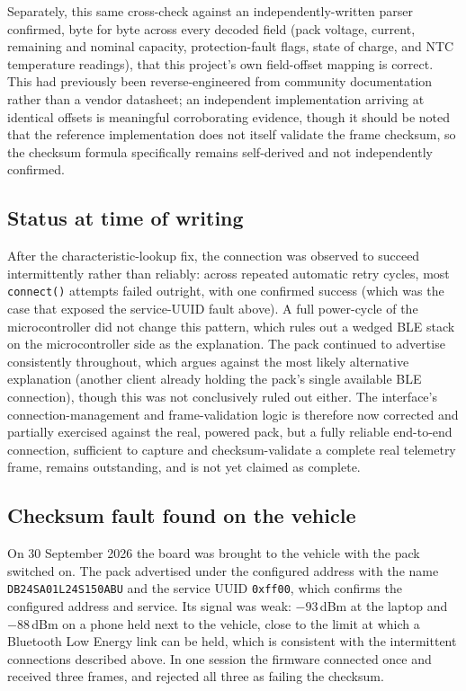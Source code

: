 Separately, this same cross-check against an independently-written parser confirmed, byte for byte across every decoded field (pack voltage, current, remaining and nominal capacity, protection-fault flags, state of charge, and NTC temperature readings), that this project's own field-offset mapping is correct. This had previously been reverse-engineered from community documentation rather than a vendor datasheet; an independent implementation arriving at identical offsets is meaningful corroborating evidence, though it should be noted that the reference implementation does not itself validate the frame checksum, so the checksum formula specifically remains self-derived and not independently confirmed.

\subsection{Status at time of writing}

After the characteristic-lookup fix, the connection was observed to succeed intermittently rather than reliably: across repeated automatic retry cycles, most \texttt{connect()} attempts failed outright, with one confirmed success (which was the case that exposed the service-UUID fault above). A full power-cycle of the microcontroller did not change this pattern, which rules out a wedged BLE stack on the microcontroller side as the explanation. The pack continued to advertise consistently throughout, which argues against the most likely alternative explanation (another client already holding the pack's single available BLE connection), though this was not conclusively ruled out either. The interface's connection-management and frame-validation logic is therefore now corrected and partially exercised against the real, powered pack, but a fully reliable end-to-end connection, sufficient to capture and checksum-validate a complete real telemetry frame, remains outstanding, and is not yet claimed as complete.

\subsection{Checksum fault found on the vehicle}

On 30 September 2026 the board was brought to the vehicle with the pack switched on. The pack advertised under the configured address with the name \texttt{DB24SA01L24S150ABU} and the service UUID \texttt{0xff00}, which confirms the configured address and service. Its signal was weak: $-93$\,dBm at the laptop and $-88$\,dBm on a phone held next to the vehicle, close to the limit at which a Bluetooth Low Energy link can be held, which is consistent with the intermittent connections described above. In one session the firmware connected once and received three frames, and rejected all three as failing the checksum.

